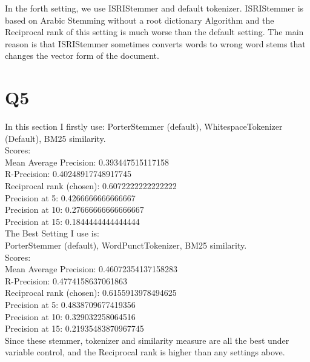 \documentclass{article}
\begin{document}
In the forth setting, we use ISRIStemmer and default tokenizer. ISRIStemmer is
based on Arabic Stemming without a root dictionary Algorithm and the Reciprocal 
rank of this setting is much worse than the default setting. The main reason is 
that ISRIStemmer sometimes converts words to wrong word stems that changes the 
vector form of the document.\\

\section*{Q5}
In this section I firstly use:
PorterStemmer (default), WhitespaceTokenizer (Default), BM25 similarity.\\
Scores:\\
Mean Average Precision: 0.393447515117158\\
R-Precision: 0.40248917748917745\\
Reciprocal rank (chosen): 0.6072222222222222\\
Precision at 5: 0.4266666666666667\\
Precision at 10: 0.27666666666666667\\
Precision at 15: 0.1844444444444444\\

The Best Setting I use is:\\
PorterStemmer (default), WordPunctTokenizer, BM25 similarity.\\
Scores:\\
Mean Average Precision: 0.46072354137158283\\
R-Precision: 0.4774158637061863\\
Reciprocal rank (chosen): 0.6155913978494625\\
Precision at 5: 0.4838709677419356\\
Precision at 10: 0.329032258064516\\
Precision at 15: 0.21935483870967745\\
Since these stemmer, tokenizer and similarity measure are all the best under 
variable control, and the Reciprocal rank is higher than any settings above.
\end{document}
